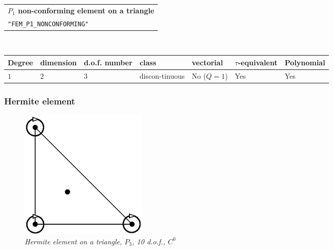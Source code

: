 \documentclass[10pt,a4paper]{article}
\begin{document}
\begin{center}
\begin{tabular}{|m{16.11cm}|} \hline 
{ \bf $P_1$ non-conforming element on a triangle}\\
{\tt "FEM\_P1\_NONCONFORMING"} 
\end{tabular} \\ \vspace{-1pt} 
\begin{tabular}{|m{2cm}|m{2cm}|m{2.5cm}|m{1.2cm}|m{2cm}|m{2cm}|m{1.8cm}|} \hline 
Degree & dimension & d.o.f. number & class & vectorial & \mbox{$\tau$-equivalent} & Polynomial\\ \hline
$1$ & $2$ & $3$ & discon-tinuous & No \mbox{($Q = 1$)} & Yes & Yes\\ \hline
\end{tabular}
\end{center}

\subsubsection{Hermite element}

\begin{figure}[H]
  \begin{center}
    \includegraphics[width=6cm,angle=0]{getfemlist_triangle_hermite.eps}
  \end{center}
  \caption{ \it Hermite element on a triangle, $P_3$, 10 d.o.f., $C^0$ }
  \label{fig:triangle_hermite}
\end{figure}
\end{document}
